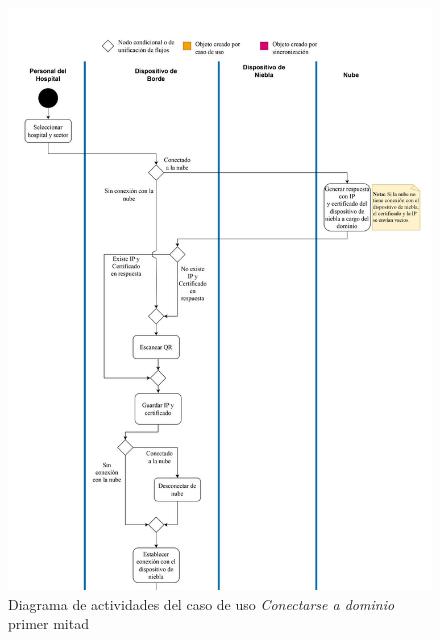 \begin{figure}
    \centering
    \includegraphics[width=\textwidth, height=\textheight, keepaspectratio]{Imagenes/Implementacion/ConectarseDominioDA1.pdf}
    \caption{Diagrama de actividades del caso de uso \textit{Conectarse a dominio} primer mitad}
    \label{fig:diagActConectDom}
\end{figure}

